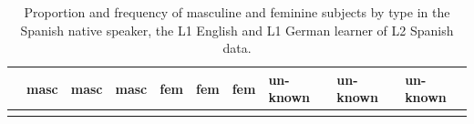\documentclass[
  letterpaper,
  DIV=11,
  numbers=noendperiod]{scrartcl}
\begin{document}
\begin{longtable}[]{@{}
  >{\raggedright\arraybackslash}p{}
  >{\raggedright\arraybackslash}p{}
  >{\raggedright\arraybackslash}p{}
  >{\raggedright\arraybackslash}p{}
  >{\raggedright\arraybackslash}p{}
  >{\raggedright\arraybackslash}p{}
  >{\raggedright\arraybackslash}p{}
  >{\raggedright\arraybackslash}p{}
  >{\raggedright\arraybackslash}p{}
  >{\raggedright\arraybackslash}p{}@{}}
\caption{Proportion and frequency of masculine and feminine subjects by
type in the Spanish native speaker, the L1 English and L1 German learner
of L2 Spanish data.}\label{tbl-genus-L1English}\tabularnewline
\toprule\noalign{}
\begin{minipage}[b]{\linewidth}\raggedright
\end{minipage} & \begin{minipage}[b]{\linewidth}\raggedright
masc
\end{minipage} & \begin{minipage}[b]{\linewidth}\raggedright
masc
\end{minipage} & \begin{minipage}[b]{\linewidth}\raggedright
masc
\end{minipage} & \begin{minipage}[b]{\linewidth}\raggedright
fem
\end{minipage} & \begin{minipage}[b]{\linewidth}\raggedright
fem
\end{minipage} & \begin{minipage}[b]{\linewidth}\raggedright
fem
\end{minipage} & \begin{minipage}[b]{\linewidth}\raggedright
un-known
\end{minipage} & \begin{minipage}[b]{\linewidth}\raggedright
un-known
\end{minipage} & \begin{minipage}[b]{\linewidth}\raggedright
un-known
\end{minipage} \\
\midrule\noalign{}

\end{longtable}
\end{document}
